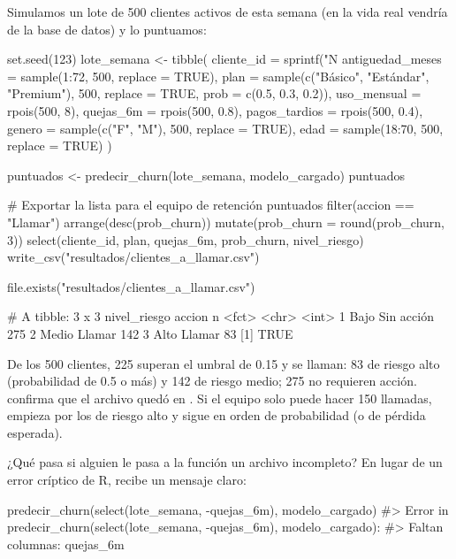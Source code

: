 Simulamos un lote de 500 clientes activos de esta semana (en la vida real
vendría de la base de datos) y lo puntuamos:

\begin{rcode}
set.seed(123)
lote_semana <- tibble(
  cliente_id       = sprintf("N%
  antiguedad_meses = sample(1:72, 500, replace = TRUE),
  plan             = sample(c("Básico", "Estándar", "Premium"), 500,
                            replace = TRUE, prob = c(0.5, 0.3, 0.2)),
  uso_mensual      = rpois(500, 8),
  quejas_6m        = rpois(500, 0.8),
  pagos_tardios    = rpois(500, 0.4),
  genero           = sample(c("F", "M"), 500, replace = TRUE),
  edad             = sample(18:70, 500, replace = TRUE)
)

puntuados <- predecir_churn(lote_semana, modelo_cargado)
puntuados %

# Exportar la lista para el equipo de retención
puntuados %
  filter(accion == "Llamar") %
  arrange(desc(prob_churn)) %
  mutate(prob_churn = round(prob_churn, 3)) %
  select(cliente_id, plan, quejas_6m, prob_churn, nivel_riesgo) %
  write_csv("resultados/clientes_a_llamar.csv")

file.exists("resultados/clientes_a_llamar.csv")
\end{rcode}

\begin{rsalida}
# A tibble: 3 x 3
  nivel_riesgo accion         n
  <fct>        <chr>      <int>
1 Bajo         Sin acción   275
2 Medio        Llamar       142
3 Alto         Llamar        83
[1] TRUE
\end{rsalida}

De los 500 clientes, 225 superan el umbral de 0.15 y se llaman: 83 de riesgo
alto (probabilidad de 0.5 o más) y 142 de riesgo medio; 275 no requieren
acción.  confirma que el archivo quedó en
. Si el equipo solo puede hacer 150 llamadas, empieza por
los de riesgo alto y sigue en orden de probabilidad (o de pérdida esperada).

¿Qué pasa si alguien le pasa a la función un archivo incompleto? En lugar de un
error críptico de R, recibe un mensaje claro:

\begin{rnoejecutar}
predecir_churn(select(lote_semana, -quejas_6m), modelo_cargado)
#> Error in predecir_churn(select(lote_semana, -quejas_6m), modelo_cargado):
#>   Faltan columnas: quejas_6m
\end{rnoejecutar}

